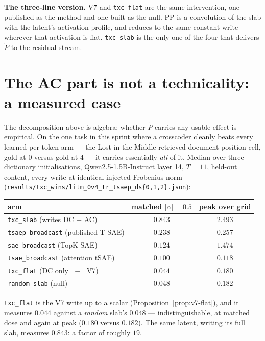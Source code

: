 \documentclass[11pt]{article}
\theoremstyle{definition}
\newcommand{\slab}{P}
\newcommand{\ac}{\widetilde{\slab}}
\begin{document}
\noindent
\textbf{The three-line version.} V7 and \texttt{txc\_flat} are the same intervention, one
published as the method and one built as the null. PP is a convolution of the slab with the
latent's activation profile, and reduces to the same constant write wherever that activation is
flat. \texttt{txc\_slab} is the only one of the four that delivers $\ac$ to the residual stream.

\section{The AC part is not a technicality: a measured case}
\label{sec:measured}

The decomposition above is algebra; whether $\ac$ carries any usable effect is empirical. On the
one task in this sprint where a crosscoder cleanly beats every learned per-token arm --- the
Lost-in-the-Middle retrieved-document-position cell, gold at $0$ versus gold at $4$ --- it carries
essentially \emph{all} of it. Median over three dictionary initialisations, Qwen2.5-1.5B-Instruct
layer 14, $T=11$, held-out content, every write at identical injected Frobenius norm
(\texttt{results/txc\_wins/litm\_0v4\_tr\_tsaep\_ds\{0,1,2\}.json}):

\begin{center}
\begin{tabular}{@{}lcc@{}}
\toprule
arm & matched $|\alpha|=0.5$ & peak over grid\\
\midrule
\texttt{txc\_slab} \quad(writes DC $+$ AC)          & $\mathbf{0.843}$ & $\mathbf{2.493}$\\
\texttt{tsaep\_broadcast} (published T-SAE)          & $0.238$ & $0.257$\\
\texttt{sae\_broadcast} (TopK SAE)                   & $0.124$ & $1.474$\\
\texttt{tsae\_broadcast} (attention tSAE)            & $0.100$ & $0.118$\\
\texttt{txc\_flat} \quad(DC only $\;\equiv\;$ V7)    & $0.044$ & $0.180$\\
\texttt{random\_slab} \quad(null)                    & $0.048$ & $0.182$\\
\bottomrule
\end{tabular}
\end{center}

\texttt{txc\_flat} is the V7 write up to a scalar (Proposition~\ref{prop:v7-flat}), and it measures
$0.044$ against a \emph{random} slab's $0.048$ --- indistinguishable, at matched dose and again at
peak ($0.180$ versus $0.182$). The same latent, writing its full slab, measures $0.843$: a factor
of roughly $19$.
\end{document}
